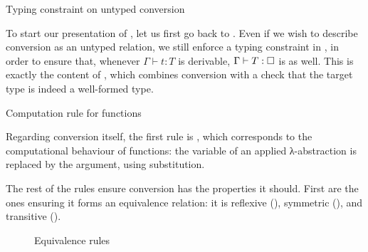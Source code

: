 \begin{marginfigure}
  \ContinuedFloat*
  \begin{mathpar}
    \label{rule:cic-conv-unty}
  \end{mathpar}
  \caption{Typing constraint on untyped conversion}
\end{marginfigure}

To start our presentation of ,
let us first go back to .
Even if we wish to describe conversion as
an untyped relation, we still enforce a typing constraint in ,
in order to ensure that, whenever $\Gamma \vdash t : T$ is derivable,
$\Gamma \vdash T : \uni$ is as well.
This is exactly the content of , which combines conversion
with a check that the target type is indeed a well-formed type.

\begin{marginfigure}
  \ContinuedFloat
  \begin{mathpar}
    \label{rule:cic-uconv-beta}
  \end{mathpar}
  \caption{Computation rule for functions}
\end{marginfigure}

Regarding conversion itself, the first rule is ,
which corresponds to the computational behaviour
of functions: the variable of an applied λ-abstraction is replaced by the argument, using
substitution.

The rest of the rules ensure conversion has the properties it should. First are the
ones ensuring it forms an equivalence relation: it
is reflexive (), symmetric (),
and transitive ().

\begin{figure}[ht]
  \ContinuedFloat
  \caption{Equivalence rules}
  \label{fig:cic-uconv-equiv}
\end{figure}

